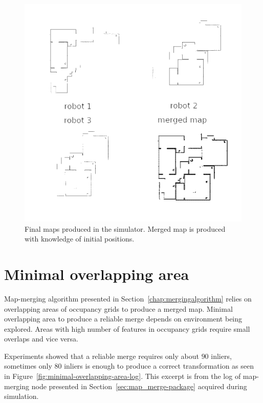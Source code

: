\begin{figure}
    \centering
    \includegraphics[width=\textwidth]{../img/merging-with-known-initial-positions-end.png}
    \caption[Final maps produced in during experiment the simulator.]{Final maps produced in the simulator. Merged map is produced with knowledge of initial positions.}
    \label{fig:merging-with-known-initial-positions-end}
\end{figure}

\section{Minimal overlapping area}
\label{sec:minimal-overlaping-area}

Map-merging algorithm presented in Section~\ref{chap:mergingalgorithm} relies on overlapping areas of occupancy grids to produce a merged map. Minimal overlapping area to produce a reliable merge depends on environment being explored. Areas with high number of features in occupancy grids require small overlaps and vice versa.

Experiments showed that a reliable merge requires only about $90$ inliers, sometimes only $80$ inliers is enough to produce a correct transformation as seen in Figure~\ref{fig:minimal-overlapping-area-log}. This excerpt is from the log of map-merging node presented in Section~\ref{sec:map_merge-package} acquired during simulation.

